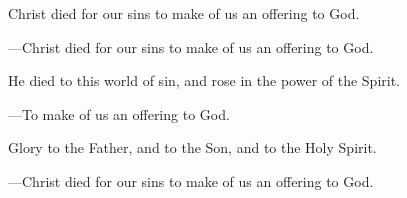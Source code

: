\responsory
\begin{hangpar}

Christ died for our sins to make of us an offering to God.

{\color{red}---\thinspace}Christ died for our sins to make of us an offering to God.

\medskip He died to this world of sin, and rose in the power of the Spirit.

{\color{red}---\thinspace}To make of us an offering to God.

\medskip Glory to the Father, and to the Son, and to the Holy Spirit.

{\color{red}---\thinspace}Christ died for our sins to make of us an offering to God.
\end{hangpar}
